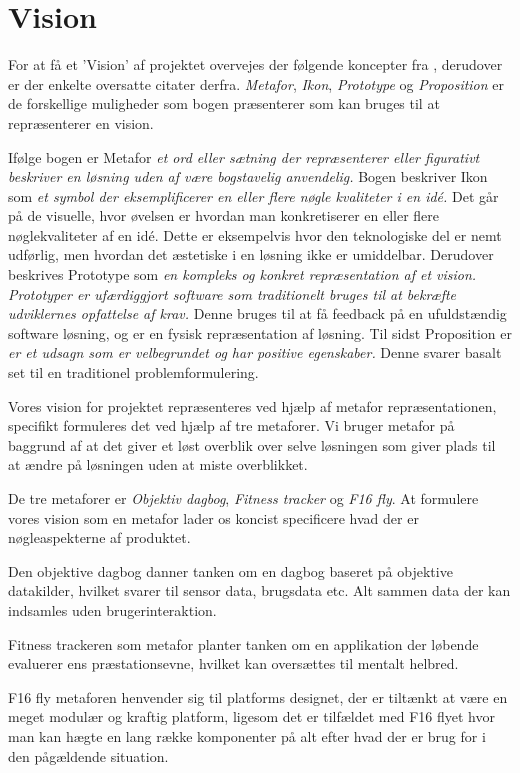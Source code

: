 \section{Vision}
For at få et 'Vision' af projektet overvejes der følgende koncepter fra \citet{art:essence}, derudover er der enkelte oversatte citater derfra.
\textit{Metafor}, \textit{Ikon}, \textit{Prototype} og \textit{Proposition} er de forskellige muligheder som bogen præsenterer som kan bruges til at repræsenterer en vision.

Ifølge bogen er Metafor \textit{et ord eller sætning der repræsenterer eller figurativt beskriver en løsning uden af være bogstavelig anvendelig.}
Bogen beskriver Ikon som \textit{et symbol der eksemplificerer en eller flere nøgle kvaliteter i en idé.} Det går på de visuelle, hvor øvelsen er hvordan man konkretiserer en eller flere nøglekvaliteter af en idé. Dette er eksempelvis hvor den teknologiske del er nemt udførlig, men hvordan det æstetiske i en løsning ikke er umiddelbar.
Derudover beskrives Prototype som \textit{en kompleks og konkret repræsentation af et vision. Prototyper er ufærdiggjort software som traditionelt bruges til at bekræfte udviklernes opfattelse af krav.} Denne bruges til at få feedback på en ufuldstændig software løsning, og er en fysisk repræsentation af løsning. 
Til sidst Proposition er \textit{er et udsagn som er velbegrundet og har positive egenskaber.} Denne svarer basalt set til en traditionel problemformulering. 

Vores vision for projektet repræsenteres ved hjælp af metafor repræsentationen, specifikt formuleres det ved hjælp af tre metaforer.
Vi bruger metafor på baggrund af at det giver et løst overblik over selve løsningen som giver plads til at ændre på løsningen uden at miste overblikket. 

De tre metaforer er \textit{Objektiv dagbog}, \textit{Fitness tracker} og \textit{F16 fly}.
At formulere vores vision som en metafor lader os koncist specificere hvad der er nøgleaspekterne af produktet.

Den objektive dagbog danner tanken om en dagbog baseret på objektive datakilder, hvilket svarer til sensor data, brugsdata etc.
Alt sammen data der kan indsamles uden brugerinteraktion.

Fitness trackeren som metafor planter tanken om en applikation der løbende evaluerer ens præstationsevne, hvilket kan oversættes til mentalt helbred.

F16 fly metaforen henvender sig til platforms designet, der er tiltænkt at være en meget modulær og kraftig platform, ligesom det er tilfældet med F16 flyet hvor man kan hægte en lang række komponenter på alt efter hvad der er brug for i den pågældende situation.
